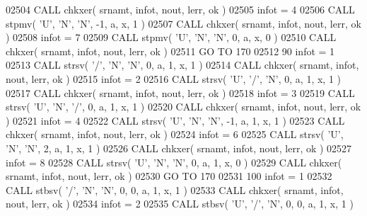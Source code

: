 \begin{DoxyCode}
02504       \textcolor{keyword}{CALL }chkxer( srnamt, infot, nout, lerr, ok )
02505       infot = 4
02506       \textcolor{keyword}{CALL }stpmv( \textcolor{stringliteral}{'U'}, \textcolor{stringliteral}{'N'}, \textcolor{stringliteral}{'N'}, -1, a, x, 1 )
02507       \textcolor{keyword}{CALL }chkxer( srnamt, infot, nout, lerr, ok )
02508       infot = 7
02509       \textcolor{keyword}{CALL }stpmv( \textcolor{stringliteral}{'U'}, \textcolor{stringliteral}{'N'}, \textcolor{stringliteral}{'N'}, 0, a, x, 0 )
02510       \textcolor{keyword}{CALL }chkxer( srnamt, infot, nout, lerr, ok )
02511       \textcolor{keywordflow}{GO TO} 170
02512    90 infot = 1
02513       \textcolor{keyword}{CALL }strsv( \textcolor{stringliteral}{'/'}, \textcolor{stringliteral}{'N'}, \textcolor{stringliteral}{'N'}, 0, a, 1, x, 1 )
02514       \textcolor{keyword}{CALL }chkxer( srnamt, infot, nout, lerr, ok )
02515       infot = 2
02516       \textcolor{keyword}{CALL }strsv( \textcolor{stringliteral}{'U'}, \textcolor{stringliteral}{'/'}, \textcolor{stringliteral}{'N'}, 0, a, 1, x, 1 )
02517       \textcolor{keyword}{CALL }chkxer( srnamt, infot, nout, lerr, ok )
02518       infot = 3
02519       \textcolor{keyword}{CALL }strsv( \textcolor{stringliteral}{'U'}, \textcolor{stringliteral}{'N'}, \textcolor{stringliteral}{'/'}, 0, a, 1, x, 1 )
02520       \textcolor{keyword}{CALL }chkxer( srnamt, infot, nout, lerr, ok )
02521       infot = 4
02522       \textcolor{keyword}{CALL }strsv( \textcolor{stringliteral}{'U'}, \textcolor{stringliteral}{'N'}, \textcolor{stringliteral}{'N'}, -1, a, 1, x, 1 )
02523       \textcolor{keyword}{CALL }chkxer( srnamt, infot, nout, lerr, ok )
02524       infot = 6
02525       \textcolor{keyword}{CALL }strsv( \textcolor{stringliteral}{'U'}, \textcolor{stringliteral}{'N'}, \textcolor{stringliteral}{'N'}, 2, a, 1, x, 1 )
02526       \textcolor{keyword}{CALL }chkxer( srnamt, infot, nout, lerr, ok )
02527       infot = 8
02528       \textcolor{keyword}{CALL }strsv( \textcolor{stringliteral}{'U'}, \textcolor{stringliteral}{'N'}, \textcolor{stringliteral}{'N'}, 0, a, 1, x, 0 )
02529       \textcolor{keyword}{CALL }chkxer( srnamt, infot, nout, lerr, ok )
02530       \textcolor{keywordflow}{GO TO} 170
02531   100 infot = 1
02532       \textcolor{keyword}{CALL }stbsv( \textcolor{stringliteral}{'/'}, \textcolor{stringliteral}{'N'}, \textcolor{stringliteral}{'N'}, 0, 0, a, 1, x, 1 )
02533       \textcolor{keyword}{CALL }chkxer( srnamt, infot, nout, lerr, ok )
02534       infot = 2
02535       \textcolor{keyword}{CALL }stbsv( \textcolor{stringliteral}{'U'}, \textcolor{stringliteral}{'/'}, \textcolor{stringliteral}{'N'}, 0, 0, a, 1, x, 1 )

\end{DoxyCode}

